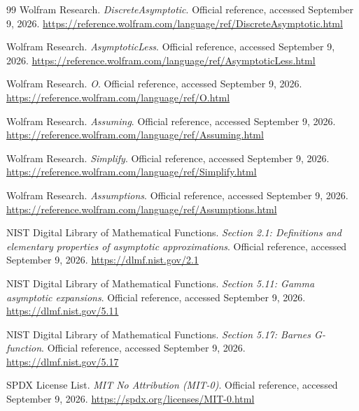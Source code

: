 \documentclass[11pt,a4paper]{article}
\theoremstyle{remark}\newtheorem{remark}[proposition]{Remark}
\begin{document}
\begin{thebibliography}{99}
 Wolfram Research. \emph{DiscreteAsymptotic}. Official reference, accessed September 9, 2026. \url{https://reference.wolfram.com/language/ref/DiscreteAsymptotic.html}

 Wolfram Research. \emph{AsymptoticLess}. Official reference, accessed September 9, 2026. \url{https://reference.wolfram.com/language/ref/AsymptoticLess.html}

 Wolfram Research. \emph{O}. Official reference, accessed September 9, 2026. \url{https://reference.wolfram.com/language/ref/O.html}

 Wolfram Research. \emph{Assuming}. Official reference, accessed September 9, 2026. \url{https://reference.wolfram.com/language/ref/Assuming.html}

 Wolfram Research. \emph{Simplify}. Official reference, accessed September 9, 2026. \url{https://reference.wolfram.com/language/ref/Simplify.html}

 Wolfram Research. \emph{Assumptions}. Official reference, accessed September 9, 2026. \url{https://reference.wolfram.com/language/ref/Assumptions.html}

 NIST Digital Library of Mathematical Functions. \emph{Section 2.1: Definitions and elementary properties of asymptotic approximations}. Official reference, accessed September 9, 2026. \url{https://dlmf.nist.gov/2.1}

 NIST Digital Library of Mathematical Functions. \emph{Section 5.11: Gamma asymptotic expansions}. Official reference, accessed September 9, 2026. \url{https://dlmf.nist.gov/5.11}

 NIST Digital Library of Mathematical Functions. \emph{Section 5.17: Barnes G-function}. Official reference, accessed September 9, 2026. \url{https://dlmf.nist.gov/5.17}

 SPDX License List. \emph{MIT No Attribution (MIT-0)}. Official reference, accessed September 9, 2026. \url{https://spdx.org/licenses/MIT-0.html}

\end{thebibliography}

\end{document}
